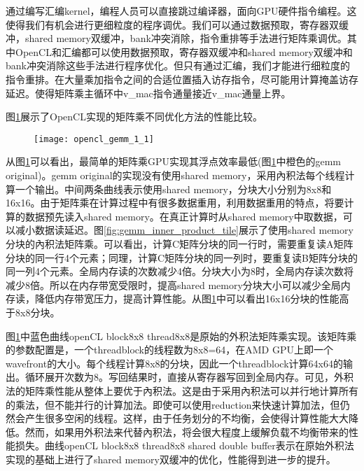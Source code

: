 通过编写汇编kernel，编程人员可以直接跳过编译器，面向GPU硬件指令编程。这使得我们有机会进行更细粒度的程序调优。我们可以通过数据预取，寄存器双缓冲，shared memory双缓冲，bank冲突消除，指令重排等手法进行矩阵乘调优。其中OpenCL和汇编都可以使用数据预取，寄存器双缓冲和shared memory双缓冲和bank冲突消除这些手法进行程序优化。但只有通过汇编，我们才能进行细粒度的指令重排。在大量乘加指令之间的合适位置插入访存指令，尽可能用计算掩盖访存延迟。使得矩阵乘主循环中v\_mac指令通量接近v\_mac通量上界。

图\ref{fig:opencl_gemm_1_1}展示了OpenCL实现的矩阵乘不同优化方法的性能比较。

\begin{figure}[htbp]
	\centering
	\texttt{[image: opencl\_gemm\_1\_1]}
	\label{fig:opencl_gemm_1_1}
\end{figure}

从图\ref{fig:opencl_gemm_1_1}可以看出，最简单的矩阵乘GPU实现其浮点效率最低(图\ref{fig:opencl_gemm_1_1}中橙色的gemm original)。gemm original的实现没有使用shared memory，采用內积法每个线程计算一个输出。中间两条曲线表示使用shared memory，分块大小分别为8x8和16x16。由于矩阵乘在计算过程中有很多数据重用，利用数据重用的特点，将要计算的数据预先读入shared memory。在真正计算时从shared memory中取数据，可以减小数据读延迟。图\ref{fig:gemm_inner_product_tile}展示了使用shared memory分块的內积法矩阵乘。可以看出，计算C矩阵分块的同一行时，需要重复读A矩阵分块的同一行4个元素；同理，计算C矩阵分块的同一列时，要重复读B矩阵分块的同一列4个元素。全局内存读的次数减少4倍。分块大小为8时，全局内存读次数将减少8倍。所以在内存带宽受限时，提高shared memory分块大小可以减少全局内存读，降低内存带宽压力，提高计算性能。从图\ref{fig:opencl_gemm_1_1}中可以看出16x16分块的性能高于8x8分块。

图\ref{fig:opencl_gemm_1_1}中蓝色曲线openCL block8x8 thread8x8是原始的外积法矩阵乘实现。该矩阵乘的参数配置是，一个threadblock的线程数为8x8=64，在AMD GPU上即一个wavefront的大小。每个线程计算8x8的分块，因此一个threadblock计算64x64的输出。循环展开次数为8。写回结果时，直接从寄存器写回到全局内存。可见，外积法的矩阵乘性能从整体上要优于內积法。这是由于采用內积法可以并行地计算所有的乘法，但不能并行的计算加法。即使可以使用reduction来快速计算加法，但仍然会产生很多空闲的线程。这样，由于任务划分的不均衡，会使得计算性能大大降低。然而，如果用外积法来代替內积法，将会很大程度上缓解负载不均衡带来的性能损失。曲线openCL block8x8 thread8x8 shared double buffer表示在原始外积法实现的基础上进行了shared memory双缓冲的优化，性能得到进一步的提升。

